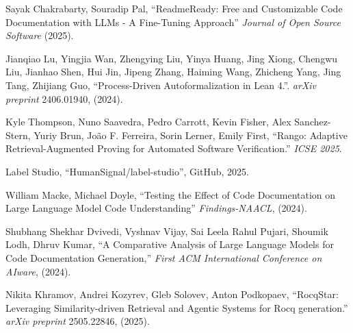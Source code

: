 \documentclass[11pt,a4paper]{article}
\begin{document}
\begin{thebibliography}{9}
    Sayak Chakrabarty, Souradip Pal,
    ``ReadmeReady: Free and Customizable Code Documentation with LLMs - A Fine-Tuning Approach''
    \emph{Journal of Open Source Software} (2025).

    Jianqiao Lu, Yingjia Wan, Zhengying Liu, Yinya Huang, Jing Xiong, Chengwu Liu, Jianhao Shen, Hui Jin, Jipeng Zhang, Haiming Wang, Zhicheng Yang, Jing Tang, Zhijiang Guo,
    ``Process-Driven Autoformalization in Lean 4.''.
    \emph{arXiv preprint} 2406.01940, (2024).

    Kyle Thompson, Nuno Saavedra, Pedro Carrott, Kevin Fisher, Alex Sanchez-Stern, Yuriy Brun, João F. Ferreira, Sorin Lerner, Emily First,
    ``Rango: Adaptive Retrieval-Augmented Proving for Automated Software Verification.''
    \emph{ICSE 2025}.

    Label Studio, “HumanSignal/label-studio”, GitHub, 2025.

    William Macke, Michael Doyle,
    ``Testing the Effect of Code Documentation on Large Language Model Code Understanding''
    \emph{Findings-NAACL}, (2024).

    Shubhang Shekhar Dvivedi, Vyshnav Vijay, Sai Leela Rahul Pujari, Shoumik Lodh, Dhruv Kumar,
    ``A Comparative Analysis of Large Language Models for Code Documentation Generation,''
    \emph{First ACM International Conference on AIware}, (2024).

    Nikita Khramov, Andrei Kozyrev, Gleb Solovev, Anton Podkopaev,
    ``RocqStar: Leveraging Similarity-driven Retrieval and Agentic Systems for Rocq generation.''
    \emph{arXiv preprint} 2505.22846, (2025).

\end{thebibliography}
\end{document}
